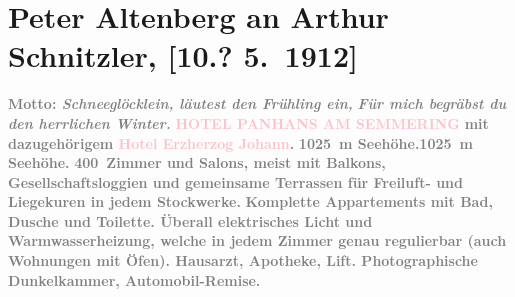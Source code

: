 

               \section[Peter Altenberg an Arthur Schnitzler, {[}10.? 5. 1912{]}]{ Peter Altenberg an Arthur Schnitzler, {[}10.? 5. 1912{]}}\nopagebreak{}\rehead{ }\normalsize\beginnumbering{} \toendnotes[C]{\smallbreak\pagebreak[2]} 
\toendnotes[C]{\smallbreak}\pstart
           \noindent{}\raggedleft{}{\pb}\textcolor{gray}{\textbf{Motto: \emph{Schneeglöcklein, läutest den
                            Frühling ein,}}}\pend
           \pstart
           \noindent{}\raggedleft{}\textcolor{gray}{\textbf{\emph{Für mich begräbst du den herrlichen Winter.}}}\pend
           \pstart
           \noindent{}\centering{}\textcolor{gray}{\textbf{\textcolor{pink}{HOTEL PANHANS AM SEMMERING}{}\ledrightnote{\textcolor{pink}{Hotel Panhans}}}}\pend
           \pstart
           \noindent{}\centering{}\textcolor{gray}{\textbf{mit dazugehörigem \textcolor{pink}{Hotel
                            Erzherzog Johann}{}\ledrightnote{\textcolor{pink}{Hotel Erzherzog Johann}}.}}\pend
           \pstart
           \noindent{}\textcolor{gray}{\textbf{1025 m Seehöhe.}}\hfill \textcolor{gray}{\textbf{1025 m Seehöhe.}}\pend
           \pstart
           \centering{}\textcolor{gray}{\textbf{400 Zimmer und Salons, meist mit Balkons,
                        Gesellschaftsloggien und gemeinsame Terrassen für Freiluft- und Liegekuren
                        in jedem Stockwerke.}}\pend
           \pstart
           \noindent{}\centering{}\textcolor{gray}{\textbf{Komplette Appartements mit Bad, Dusche und Toilette.
                        Überall elektrisches Licht und Warmwasserheizung, welche in jedem Zimmer
                        genau regulierbar (auch Wohnungen mit Öfen). Hausarzt, Apotheke, Lift.
                        Photographische Dunkelkammer, Automobil-Remise.}}\pend
